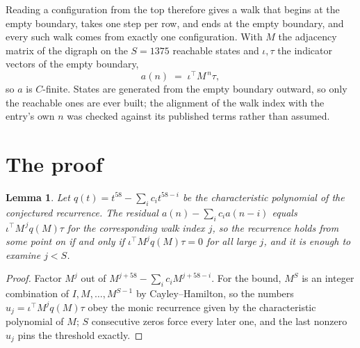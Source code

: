 \documentclass[11pt,a4paper]{article}
\theoremstyle{plain}
\newtheorem{lemma}[theorem]{Lemma}
\theoremstyle{definition}
\begin{document}
Reading a configuration from the top therefore gives a walk that begins at the empty boundary,
takes one step per row, and ends at the empty boundary, and every such walk comes from exactly
one configuration. With $M$ the adjacency matrix of the digraph on the $S=1375$ reachable
states and $\iota,\tau$ the indicator vectors of the empty boundary,
\[
a(n)\;=\;\iota^{\!\top}M^{\,n}\tau ,
\]
so $a$ is $C$-finite. States are generated from the empty boundary outward, so only the
reachable ones are ever built; the alignment of the walk index with the entry's own $n$ was
checked against its published terms rather than assumed.

\section{The proof}

\begin{lemma}\label{lem:crit}
Let $q(t)=t^{58}-\sum_i c_it^{58-i}$ be the characteristic polynomial of the
conjectured recurrence. The residual $a(n)-\sum_ic_ia(n-i)$ equals
$\iota^{\!\top}M^{\,j}q(M)\tau$ for the corresponding walk index $j$, so the recurrence
holds from some point on if and only if $\iota^{\!\top}M^{j}q(M)\tau=0$ for all large $j$,
and it is enough to examine $j<S$.
\end{lemma}

\begin{proof}
Factor $M^{j}$ out of $M^{j+58}-\sum_ic_iM^{j+58-i}$. For the bound, $M^{S}$
is an integer combination of $I,M,\dots,M^{S-1}$ by Cayley--Hamilton, so the numbers
$u_j=\iota^{\!\top}M^{j}q(M)\tau$ obey the monic recurrence given by the characteristic
polynomial of $M$; $S$ consecutive zeros force every later one, and the last nonzero $u_j$
pins the threshold exactly.
\end{proof}
\end{document}
